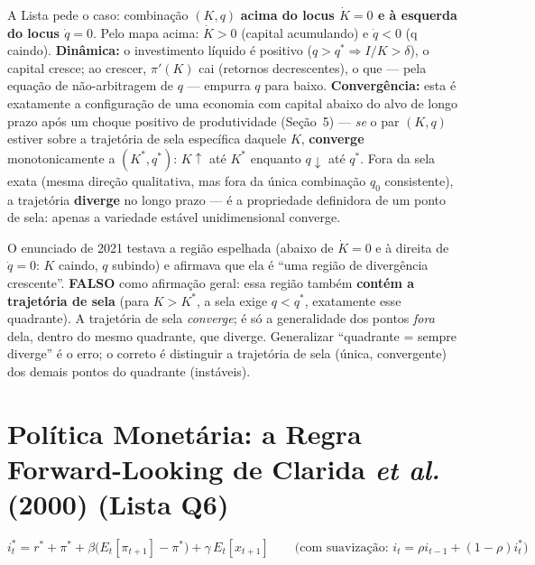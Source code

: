 \documentclass[12pt, a4paper]{article}
\begin{document}
\begin{provabox}[title={Resposta ao enunciado da Lista Q5}]
A Lista pede o caso: combinação $(K,q)$ \textbf{acima do locus $\dot K=0$ e à
esquerda do locus $\dot q=0$}. Pelo mapa acima: $\dot K>0$ (capital
acumulando) e $\dot q<0$ (q caindo). \textbf{Dinâmica:} o investimento líquido
é positivo ($q>q^*\Rightarrow I/K>\delta$), o capital cresce; ao crescer,
$\pi'(K)$ cai (retornos decrescentes), o que --- pela equação de
não-arbitragem de $q$ --- empurra $q$ para baixo. \textbf{Convergência:} esta
é exatamente a configuração de uma economia com capital abaixo do alvo de
longo prazo após um choque positivo de produtividade (Seção~5) --- \emph{se}
o par $(K,q)$ estiver sobre a trajetória de sela específica daquele $K$,
\textbf{converge} monotonicamente a $(K^*,q^*)$: $K\uparrow$ até $K^*$ enquanto
$q\downarrow$ até $q^*$. Fora da sela exata (mesma direção qualitativa, mas
fora da única combinação $q_0$ consistente), a trajetória \textbf{diverge} no
longo prazo --- é a propriedade definidora de um ponto de sela: apenas a
variedade estável unidimensional converge.
\end{provabox}

\begin{armbox}[title={Armadilha (P2-2021 Q2-ii): a região oposta não é ``divergência garantida''}]
O enunciado de 2021 testava a região espelhada (abaixo de $\dot K=0$ e à
direita de $\dot q=0$: $K$ caindo, $q$ subindo) e afirmava que ela é ``uma
região de divergência crescente''. \textbf{FALSO} como afirmação geral: essa
região também \textbf{contém a trajetória de sela} (para $K>K^*$, a sela
exige $q<q^*$, exatamente esse quadrante). A trajetória de sela
\emph{converge}; é só a generalidade dos pontos \emph{fora} dela, dentro do
mesmo quadrante, que diverge. Generalizar ``quadrante = sempre diverge'' é o
erro; o correto é distinguir a trajetória de sela (única, convergente) dos
demais pontos do quadrante (instáveis).
\end{armbox}

\section{Política Monetária: a Regra Forward-Looking de Clarida \textit{et al.} (2000) (Lista Q6)}

\begin{formulabox}[title={Formulação da regra}]
\[
  \boxed{i_t^{*} = r^{*} + \pi^{*} + \beta\bigl(E_t[\pi_{t+1}] - \pi^{*}\bigr) + \gamma\, E_t[x_{t+1}]}
  \qquad\text{(com suavização: } i_t=\rho i_{t-1}+(1-\rho)i_t^*\text{)}
\]
\end{formulabox}
\end{document}
